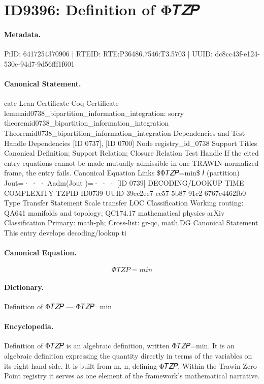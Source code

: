 \section*{ID9396: Definition of Φ𝑇𝑍𝑃}
\paragraph{Metadata.}
PiID: 6417254370906 | RTEID: RTE:P36486.7546:T3.5703 | UUID: dc8cc43f-e124-530e-94d7-9d56fff1f601

\paragraph{Canonical Statement.}
cate Lean Certificate Coq Certificate lemmaid0738\_bipartition\_information\_integration: sorry theoremid0738\_bipartition\_information\_integration Theoremid0738\_bipartition\_information\_integration Dependencies and Test Handle Dependencies [ID 0737], [ID 0700] Node registry\_id\_0738 Support Titles Canonical Definition; Support Relation; Closure Relation Test Handle If the cited entry equations cannot be made mutually admissible in one TRAWIN-normalized frame, the entry fails. Canonical Equation Links \$Φ𝑇𝑍𝑃=min\$ 𝐼 (partition) Jout=· · · Aadm(Jout )=· · · [ID 0739] DECODING/LOOKUP TIME COMPLEXITY TZPID ID0739 UUID 39ec2ee7-cc57-5b87-91c2-6767c4462fb0 Type Transfer Statement Scale transfer LOC Classification Working routing: QA641 manifolds and topology; QC174.17 mathematical physics arXiv Classification Primary: math-ph; Cross-list: gr-qc, math.DG Canonical Statement This entry develops decoding/lookup ti

\paragraph{Canonical Equation.}
\[
Φ𝑇𝑍𝑃=min
\]

\paragraph{Dictionary.}
Definition of Φ𝑇𝑍𝑃 — Φ𝑇𝑍𝑃=min

\paragraph{Encyclopedia.}
Definition of Φ𝑇𝑍𝑃 is an algebraic definition, written Φ𝑇𝑍𝑃=min. It is an algebraic definition expressing the quantity directly in terms of the variables on its right-hand side. It is built from m, n, defining Φ𝑇𝑍𝑃. Within the Trawin Zero Point registry it serves as one element of the framework's mathematical narrative.
